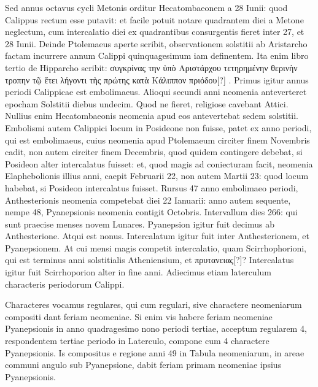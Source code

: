 Sed annus octavus
cycli Metonis orditur Hecatombaeonem a 28 Iunii: quod Calippus
rectum esse putavit: et facile potuit notare quadrantem diei a Metone
neglectum, cum intercalatio diei ex quadrantibus consurgentis fieret
inter 27, et 28 Iunii.
Deinde Ptolemaeus aperte scribit, observationem
solstitii ab Aristarcho factam incurrere annum Calippi quinquagesimum
iam definentem.
Ita enim libro tertio de Hipparcho
scribit: \textgreek{συγκρίνας την ὑπὸ Αριστάρχου τετηρημένην
 θερινὴν τροπην τῷ 
ἔτει λήγοντι τὴς πρώτης κατὰ Κάλιππον πριόδου[?]} .
Primus igitur annus periodi
Calippicae est embolimaeus.
Alioqui secundi anni neomenia anteverteret
epocham Solstitii diebus undecim.
Quod ne fieret, religiose cavebant
Attici.
Nullius enim Hecatombaeonis neomenia apud eos antevertebat
sedem solstitii.
Embolismi autem Calippici locum in Posideone
non fuisse, patet ex  anno periodi, qui est embolimaeus,
cuius neomenia apud Ptolemaeum circiter finem Novembris cadit, non
autem circiter finem Decembris, quod quidem contingere debebat,
si Posideon alter intercalatus fuisset: et, quod magis ad coniecturam
facit, neomenia Elaphebolionis illius anni, caepit Februarii
22, non autem Martii 23: quod locum habebat, si Posideon intercalatus
fuisset.
Rursus 47 anno embolimaeo periodi, Anthesterionis
neomenia competebat diei 22 Ianuarii: anno autem sequente, nempe
48, Pyanepsionis neomenia contigit  Octobris.
Intervallum
dies 266: qui sunt praecise menses novem Lunares.
Pyanepsion igitur
fuit decimus ab Anthesterione.
Atqui est nonus.
Intercalatum
igitur fuit inter Anthesterionem, et Pyanepsionem.
At cui mensi
magis competit intercalatio, quam Scirrhophorioni, qui est terminus
anni solstitialis Atheniensium, et \textgreek{πρυτανειας[?]}?
Intercalatus igitur fuit Scirrhoporion alter in fine anni.
Adiecimus etiam laterculum characteris periodorum
Calippi.
\begin{table}[htbp]
 
\end{table}

Characteres vocamus regulares, qui
cum regulari, sive charactere neomeniarum compositi
dant feriam neomeniae.
Si enim vis habere feriam neomeniae
Pyanepsionis in anno quadragesimo nono periodi
tertiae, acceptum regularem 4, respondentem tertiae periodo
in Laterculo, compone cum 4 charactere Pyanepsionis.
Is compositus e regione anni 49 in Tabula
neomeniarum, in areae communi angulo sub Pyanepsione, dabit feriam
primam neomeniae ipsius Pyanepsionis.

